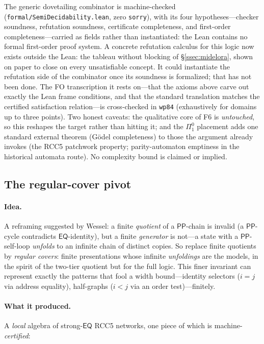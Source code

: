 \documentclass[11pt]{article}
\newcommand{\PP}{\mathsf{PP}}
\newcommand{\EQ}{\mathsf{EQ}}
\newcommand{\code}[1]{\texttt{#1}}
\theoremstyle{plain}
\theoremstyle{definition}
\begin{document}
The generic dovetailing combinator is machine-checked
(\code{formal/SemiDecidability.lean}, zero \code{sorry}), with its four
hypotheses---checker soundness, refutation soundness, certificate
completeness, and first-order completeness---carried as fields rather than
instantiated: the Lean contains no formal first-order proof system. A concrete
refutation calculus for this logic now exists outside the Lean: the tableau
without blocking of \S\ref{ssec:midelora}, shown on paper to close on every
unsatisfiable concept. It could instantiate the refutation side of the
combinator once its soundness is formalized; that has not been done. The FO
transcription it rests on---that the axioms above carve out exactly the
Lean frame conditions, and that the standard translation matches the
certified satisfaction relation---is cross-checked in \code{wp84}
(exhaustively for domains up to three points). Two honest caveats: the
qualitative core of F6 is \emph{untouched}, so this reshapes the target
rather than hitting it; and the $\Pi^0_1$ placement adds one standard
external theorem (G\"odel completeness) to those the argument already
invokes (the RCC5 patchwork property; parity-automaton emptiness in the
historical automata route). No complexity bound is claimed or implied.

\subsection{The regular-cover pivot}
\label{ssec:approach-regcov}

\paragraph{Idea.} A reframing suggested by Wessel: a finite
\emph{quotient} of a $\PP$-chain is invalid (a $\PP$-cycle contradicts
$\EQ$-identity), but a finite \emph{generator} is not---a state with a
$\PP$-self-loop \emph{unfolds} to an infinite chain of distinct copies.
So replace finite quotients by \emph{regular covers}: finite presentations
whose infinite \emph{unfoldings} are the models, in the spirit of the
two-tier quotient but for the full logic. This finer invariant can
represent exactly the patterns that fool a width bound---identity
selectors ($i=j$ via address equality), half-graphs ($i<j$ via an order
test)---finitely.

\paragraph{What it produced.} A \emph{local} algebra of strong-$\EQ$
RCC5 networks, one piece of which is machine-\emph{certified}:
\end{document}
